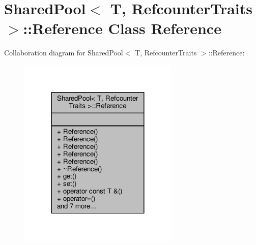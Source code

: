 \hypertarget{classSharedPool_1_1Reference}{}\section{Shared\+Pool$<$ T, Refcounter\+Traits $>$\+:\+:Reference Class Reference}
\label{classSharedPool_1_1Reference}


Collaboration diagram for Shared\+Pool$<$ T, Refcounter\+Traits $>$\+:\+:Reference\+:
\nopagebreak
\begin{figure}[H]
\begin{center}
\leavevmode
\includegraphics[width=216pt]{d1/d96/classSharedPool_1_1Reference__coll__graph}
\end{center}
\end{figure}
